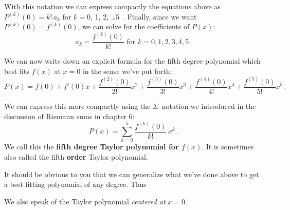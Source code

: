 {{{{With this notation we can express compactly the equations above as $P^{(k)}(0)=k!\,a_k$ for $k=0$, 1, 2, \ldots 5 \,.  Finally, since we want $P^{(k)}(0)=f^{(k)}(0)$, we can solve for the coefficients of $P(x)$:
\[
a_k = \frac{f^{(k)}(0)}{k!} \mbox{ for } k=0,1,2,3,4,5 \, .
\]

We can now write down an explicit formula for the fifth degree polynomial which best fits $f(x)$ at $x=0$ in the sense we've put forth:
\[
P(x)=f(0)+f'(0)x+\frac{f^{(2)}(0)}{2!}x^2+\frac{f^{(3)}(0)}{3!}x^3+\frac{f^{(4)}(0)}{4!}x^4+\frac{f^{(5)}(0)}{5!}x^5 \, .
\]

We can express this more compactly using the $\Sigma$--notation we introduced in the discussion of Riemann sums in chapter 6:
\[P(x)=\sum_{k=0}^{5} \frac{f^{(k)}(0)}{k!}\,x^k \, .\]
We call this the {\bf fifth degree Taylor polynomial for $f(x)$}.  It is sometimes also called the fifth {\bf order} Taylor polynomial.

It should be obvious to you that we can generalize what we've done above to get a 
best fitting polynomial of any degree.  Thus 

\noindent
\begin{center}
\end{center}

\noindent
We also speak of the Taylor polynomial {\em centered at} $x=0$.




}}}}
